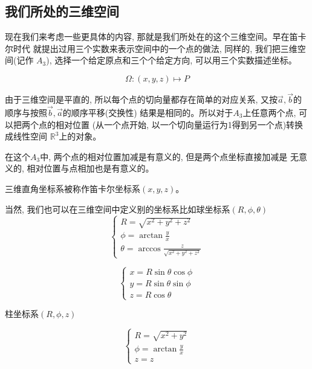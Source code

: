 \documentclass{ctexart}
\numberwithin{equation}{subsection}
\numberwithin{theorem}{subsection}
\numberwithin{definition}{subsection}
\numberwithin{proof}{subsection}
\numberwithin{lemma}{subsection}
\numberwithin{example}{subsection}
\numberwithin{remark}{subsection}
\numberwithin{corollary}{subsection}
\numberwithin{exercise}{subsection}
\numberwithin{problem}{subsection}
\numberwithin{question}{section}
\numberwithin{method}{subsection}
\begin{document}
    \subsection{我们所处的三维空间}

    现在我们来考虑一些更具体的内容, 那就是我们所处在的这个三维空间。早在笛卡尔时代
    就提出过用三个实数来表示空间中的一个点的做法, 同样的, 我们把三维空间(记作
    $A_3$), 选择一个给定原点和三个个给定方向, 可以用三个实数描述坐标。

    \begin{equation}
        \Omega : (x,y,z) \mapsto P
    \end{equation}

    由于三维空间是平直的, 所以每个点的切向量都存在简单的对应关系, 
    又按$\vec{a},\vec{b}$的顺序与按照$\vec{b},\vec{a}$的顺序平移(交换性)
    结果是相同的。所以对于$A_3$上任意两个点, 可以把两个点的相对位置
    (从一个点开始, 以一个切向量运行为1得到另一个点)转换成线性空间
    $\mathbb{R}^3$上的对象。

    在这个$A_3$中, 两个点的相对位置加减是有意义的, 但是两个点坐标直接加减是
    无意义的, 相对位置与点相加也是有意义的。

    三维直角坐标系被称作笛卡尔坐标系$(x,y,z)$。

    当然, 我们也可以在三维空间中定义别的坐标系比如球坐标系$(R,\phi,\theta)$
    \begin{equation}
        \begin{cases}
            R = \sqrt{x^2 + y^2 +z^2} \\
            \phi = \arctan{\frac{y}{x}} \\
            \theta = \arccos{\frac{z}{\sqrt{x^2 + y^2 +z^2}}}
        \end{cases}
    \end{equation}

    \begin{equation}
        \begin{cases}
            x = R\sin{\theta}\cos{\phi} \\
            y = R\sin{\theta}\sin{\phi} \\
            z = R\cos{\theta}
        \end{cases}
    \end{equation}

    柱坐标系$(R,\phi,z)$

    \begin{equation}
        \begin{cases}
            R = \sqrt{x^2 + y^2} \\
            \phi = \arctan{\frac{y}{x}} \\
            z = z
        \end{cases}
    \end{equation}
\end{document}
